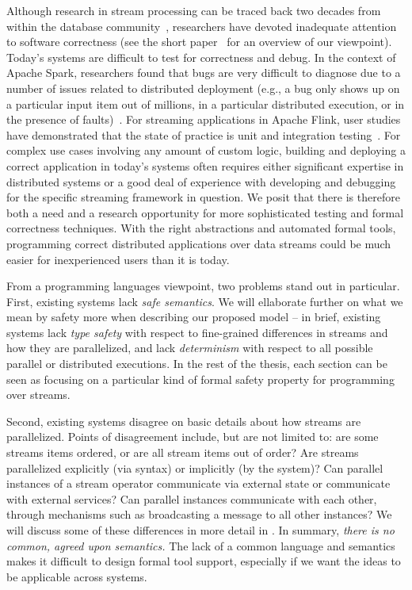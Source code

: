 Although research in stream processing can be traced back two decades from within the database community~\cite{Aurora,Borealis,STREAM2004,ABW2006CQL},
researchers have devoted inadequate attention to software correctness (see the short paper~ for an overview of our viewpoint).
Today's systems are difficult to test for correctness and debug. In the context of Apache Spark, researchers found that bugs are very difficult to diagnose due to a number of issues related to distributed deployment (e.g., a bug only shows up on a particular input item out of millions, in a particular distributed execution, or in the presence of faults)~\cite{gulzar2016bigdebug}. For streaming applications in Apache Flink, user studies have demonstrated that the state of practice is unit and integration testing~\cite{vianna2019exploratory}.
For complex use cases involving any amount of custom logic, building and deploying a correct application in today's systems often requires either significant expertise in distributed systems or a good deal of experience with developing and debugging for the specific streaming framework in question. We posit that there is therefore both a need and a research opportunity for more sophisticated testing and formal correctness techniques. With the right abstractions and automated formal tools, programming correct distributed applications over data streams could be much easier for inexperienced users than it is today.

From a programming languages viewpoint, two problems stand out in particular. First, existing systems lack \emph{safe semantics}. We will ellaborate further on what we mean by safety more when describing our proposed model -- in brief, existing systems lack \emph{type safety} with respect to fine-grained differences in streams and how they are parallelized, and lack \emph{determinism} with respect to all possible parallel or distributed executions. In the rest of the thesis, each section can be seen as focusing on a particular kind of formal safety property for programming over streams.

Second, existing systems disagree on basic details about how streams are parallelized. Points of disagreement include, but are not limited to: are some streams items ordered, or are all stream items out of order? Are streams parallelized explicitly (via syntax) or implicitly (by the system)? Can parallel instances of a stream operator communicate via external state or communicate with external services? Can parallel instances communicate with each other, through mechanisms such as broadcasting a message to all other instances? We will discuss some of these differences in more detail in . In summary, \emph{there is no common, agreed upon semantics.} The lack of a common language and semantics makes it difficult to design formal tool support, especially if we want the ideas to be applicable across systems.

